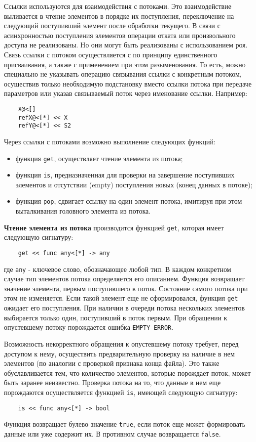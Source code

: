 Ссылки используются для взаимодействия с потоками. Это взаимодействие выливается в чтение элементов в порядке их поступления, переключение на следующий поступивший элемент после обработки текущего. В связи с асинхронностью поступления элементов операции отката или произвольного доступа не реализованы. Но они могут быть реализованы с использованием роя. Связь ссылки с потоком осуществляется с по принципу единственного присваивания, а также с применением при этом разыменования. То есть, можно специально не указывать операцию связывания ссылки с конкретным потоком, осуществив только необходимую подстановку вместо ссылки потока при передаче параметров или указав связываемый поток через именование ссылки. Например:
\begin{verbatim}
    X@<[]
    refX@<[*] << X
    refY@<[*] << S2
\end{verbatim}

Через ссылки с потоками возможно выполнение следующих функций:
\begin{itemize}
    \item функция \verb|get|, осуществляет чтение элемента из потока;
    \item функция \verb|is|, предназначенная для проверки на завершение поступивших элементов и отсутствии (empty) поступления новых (конец данных в потоке);
    \item функция \verb|pop|, сдвигает ссылку на один элемент потока, имитируя при этом выталкивания головного элемента из потока.
\end{itemize}

\textbf{Чтение элемента из потока} производится функцией \verb|get|, которая имеет следующую сигнатуру:
\begin{verbatim}
    get << func any<[*] -> any
\end{verbatim}
где \texttt{any} - ключевое слово, обозначающее любой тип. В каждом конкретном случае тип элементов потока определяется его описанием. Функция возвращает значение элемента, первым поступившего в поток. Состояние самого потока при этом не изменяется. Если такой элемент еще не сформировался, функция \texttt{get} ожидает его поступления. При наличии в очереди потока нескольких элементов выбирается только один, поступивший в поток первым. При обращении к опустевшему потоку порождается ошибка \verb|EMPTY_ERROR|.

Возможность некорректного обращения к опустевшему потоку требует, перед доступом к нему, осуществить предварительную проверку на наличие в нем элементов (по аналогии с проверкой признака конца файла). Это также обуславливается тем, что количество элементов, которые порождает поток, может быть заранее неизвестно. Проверка потока на то, что данные в нем еще порождаются осуществляется функцией \texttt{is}, имеющей следующую сигнатуру:
\begin{verbatim}
    is << func any<[*] -> bool
\end{verbatim}
Функция возвращает булево значение \texttt{true}, если поток еще может формировать данные или уже содержит их. В противном случае возвращается \texttt{false}.

